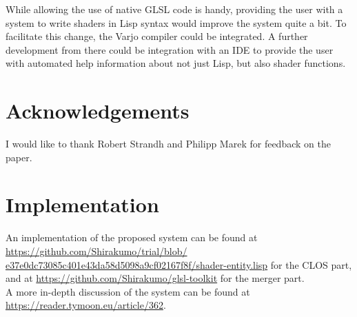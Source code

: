 \documentclass{sig-alternate}
\begin{document}
While allowing the use of native GLSL code is handy, providing the user with a system to write shaders in Lisp syntax would improve the system quite a bit. To facilitate this change, the Varjo\cite{varjo} compiler could be integrated. A further development from there could be integration with an IDE to provide the user with automated help information about not just Lisp, but also shader functions.

\section{Acknowledgements}\label{section:7}
I would like to thank Robert Strandh and Philipp Marek for feedback on the paper.

\section{Implementation}\label{section:8}
An implementation of the proposed system can be found at \href{https://github.com/Shirakumo/trial/blob/e37e0dc73085c401e43da58d5098a9cf02167f8f/shader-entity.lisp}{https://github.com/Shirakumo/trial/blob/\\e37e0dc73085c401e43da58d5098a9cf02167f8f/shader-entity.lisp} for the CLOS part, and at \url{https://github.com/Shirakumo/glsl-toolkit} for the merger part. \\

A more in-depth discussion of the system can be found at \\\url{https://reader.tymoon.eu/article/362}.


\end{document}
